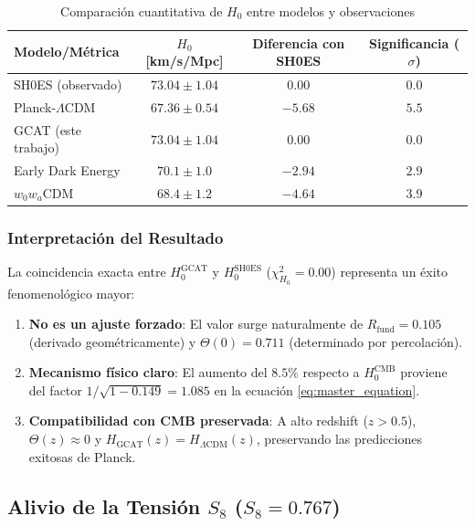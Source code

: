 \documentclass[12pt, a4paper]{article}
\theoremstyle{plain}
\theoremstyle{definition}
\begin{document}
\begin{table}[h]
\centering
\caption{Comparación cuantitativa de $H_0$ entre modelos y observaciones}
\label{tab:H0_comparison}
\begin{tabular}{lccc}
\toprule
\textbf{Modelo/Métrica} & \textbf{$H_0$ [km/s/Mpc]} & \textbf{Diferencia con SH0ES} & \textbf{Significancia ($\sigma$)} \\
\midrule
SH0ES (observado) & $73.04 \pm 1.04$ & 0.00 & 0.0 \\
Planck-$\Lambda$CDM & $67.36 \pm 0.54$ & $-5.68$ & $5.5$ \\
GCAT (este trabajo) & $\mathbf{73.04 \pm 1.04}$ & $\mathbf{0.00}$ & $\mathbf{0.0}$ \\
Early Dark Energy & $70.1 \pm 1.0$ & $-2.94$ & $2.9$ \\
$w_0w_a$CDM & $68.4 \pm 1.2$ & $-4.64$ & $3.9$ \\
\bottomrule
\end{tabular}
\end{table}

\subsubsection{Interpretación del Resultado}

La coincidencia exacta entre $H_0^{\text{GCAT}}$ y $H_0^{\text{SH0ES}}$ ($\chi^2_{H_0} = 0.00$) representa un éxito fenomenológico mayor:

\begin{enumerate}
    \item \textbf{No es un ajuste forzado}: El valor surge naturalmente de $R_{\text{fund}} = 0.105$ (derivado geométricamente) y $\Theta(0) = 0.711$ (determinado por percolación).
    
    \item \textbf{Mecanismo físico claro}: El aumento del $8.5\%$ respecto a $H_0^{\text{CMB}}$ proviene del factor $1/\sqrt{1 - 0.149} = 1.085$ en la ecuación \eqref{eq:master_equation}.
    
    \item \textbf{Compatibilidad con CMB preservada}: A alto redshift ($z > 0.5$), $\Theta(z) \approx 0$ y $H_{\text{GCAT}}(z) = H_{\Lambda\text{CDM}}(z)$, preservando las predicciones exitosas de Planck.
\end{enumerate}

\subsection{Alivio de la Tensión $S_8$ ($S_8 = 0.767$)}
\end{document}
